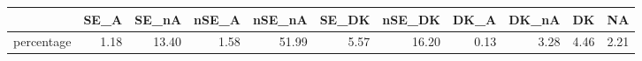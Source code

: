\begin{table}[ht]
\centering
\begin{tabular}{rrrrrrrrrrr}
  \hline
 & SE\_A & SE\_nA & nSE\_A & nSE\_nA & SE\_DK & nSE\_DK & DK\_A & DK\_nA & DK & NA \\ 
  \hline
percentage & 1.18 & 13.40 & 1.58 & 51.99 & 5.57 & 16.20 & 0.13 & 3.28 & 4.46 & 2.21 \\ 
   \hline
\end{tabular}
\end{table}
